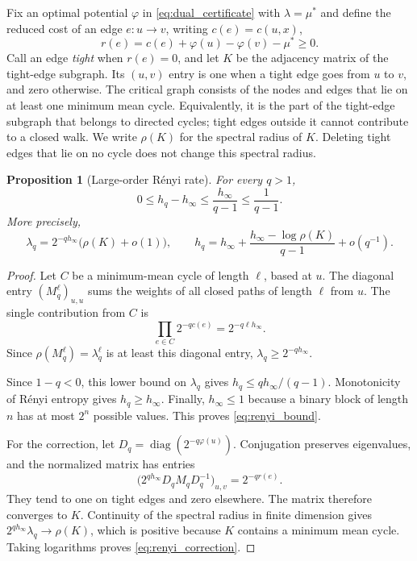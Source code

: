 \documentclass[11pt,a4paper]{article}
\newtheorem{proposition}[theorem]{Proposition}
\begin{document}
Fix an optimal potential $\varphi$ in
\eqref{eq:dual_certificate} with $\lambda=\mu^*$ and define the reduced
cost of an edge $e:u\to v$, writing $c(e)=c(u,x)$,
\[
    r(e)=c(e)+\varphi(u)-\varphi(v)-\mu^*\ge0.
\]
Call an edge \emph{tight} when $r(e)=0$, and let $K$ be the adjacency
matrix of the tight-edge subgraph.  Its $(u,v)$ entry is one when a tight
edge goes from $u$ to $v$, and zero otherwise.  The critical graph
consists of the nodes and edges that lie on at least one minimum mean
cycle.  Equivalently, it is the part of the tight-edge subgraph that
belongs to directed cycles; tight edges outside it cannot contribute
to a closed walk.  We write $\rho(K)$ for the spectral radius of $K$.
Deleting tight edges that lie on no cycle does not change this spectral
radius.

\begin{proposition}[Large-order R\'enyi rate]
\label{prop:large_order_renyi}
For every $q>1$,
\begin{equation}
\label{eq:renyi_bound}
    0\le h_q-h_\infty\le\frac{h_\infty}{q-1}\le\frac{1}{q-1}.
\end{equation}
More precisely,
\begin{equation}
\label{eq:renyi_correction}
    \lambda_q=2^{-q h_\infty}\bigl(\rho(K)+o(1)\bigr),
    \qquad
    h_q=h_\infty+
    \frac{h_\infty-\log\rho(K)}{q-1}
    +o(q^{-1}).
\end{equation}
\end{proposition}

\begin{proof}
Let $C$ be a minimum-mean cycle of length $\ell$, based at $u$.
The diagonal entry $(M_q^\ell)_{u,u}$ sums the weights of all closed
paths of length $\ell$ from $u$.  The single contribution from $C$ is
\[
    \prod_{e\in C}2^{-q c(e)}=2^{-q\ell h_\infty}.
\]
Since $\rho(M_q^\ell)=\lambda_q^\ell$ is at least this diagonal
entry, $\lambda_q\ge2^{-q h_\infty}$.

Since $1-q<0$, this lower bound on $\lambda_q$ gives
$h_q\le qh_\infty/(q-1)$.  Monotonicity of R\'enyi entropy gives
$h_q\ge h_\infty$.  Finally, $h_\infty\le1$ because a binary block
of length $n$ has at most $2^n$ possible values.  This proves
\eqref{eq:renyi_bound}.

For the correction, let
$D_q=\operatorname{diag}(2^{-q\varphi(u)})$.  Conjugation preserves
eigenvalues, and the normalized matrix has entries
\[
    \bigl(2^{q h_\infty}D_qM_qD_q^{-1}\bigr)_{u,v}
    =2^{-q r(e)}.
\]
They tend to one on tight edges and zero elsewhere.  The matrix
therefore converges to $K$.  Continuity of the spectral radius in
finite dimension gives
$2^{q h_\infty}\lambda_q\to\rho(K)$, which is positive because
$K$ contains a minimum mean cycle.  Taking logarithms proves
\eqref{eq:renyi_correction}.
\end{proof}
\end{document}
